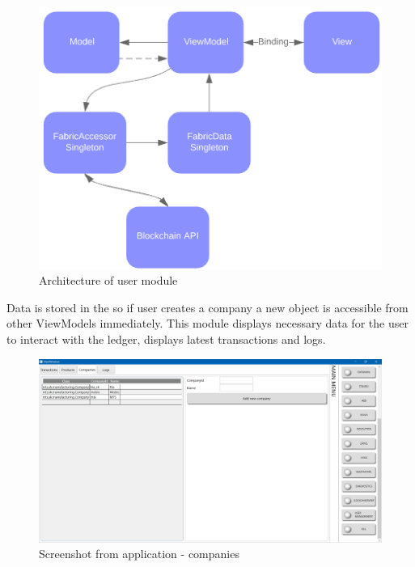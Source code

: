 \begin{figure}[H]
    \begin{center}
        \begin{minipage}{\linewidth}
            \begin{center}
                \includegraphics[width=(0.7\textwidth),keepaspectratio]{img/vortex_bc.png}
                \caption{Architecture of user module}
                \label{obr 1.2.1}
            \end{center}
        \end{minipage}
    \end{center}
\end{figure}

Data is stored in the  so if user creates a company a new object is accessible from other ViewModels immediately. This module displays necessary data for the user to interact with the ledger, displays latest transactions and logs.

\begin{figure}[H]
    \begin{center}
        \begin{minipage}{\linewidth}
            \begin{center}
                \includegraphics[width=(0.8\textwidth),keepaspectratio]{img/app/vortex_companies.png}
                \caption{Screenshot from application - companies}
                \label{obr 1.2.1}
            \end{center}
        \end{minipage}
    \end{center}
\end{figure}

